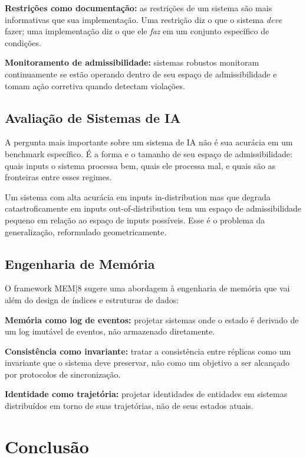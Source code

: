 \documentclass[11pt, a4paper]{article}
\theoremstyle{named}
\begin{document}
\textbf{Restrições como documentação:} as restrições de um sistema
são mais informativas que sua implementação. Uma restrição diz o que
o sistema \emph{deve} fazer; uma implementação diz o que ele \emph{faz}
em um conjunto específico de condições.

\textbf{Monitoramento de admissibilidade:} sistemas robustos monitoram
continuamente se estão operando dentro de seu espaço de admissibilidade
e tomam ação corretiva quando detectam violações.

\subsection{Avaliação de Sistemas de IA}

A pergunta mais importante sobre um sistema de IA não é sua acurácia
em um benchmark específico. É a forma e o tamanho de seu espaço de
admissibilidade: quais inputs o sistema processa bem, quais ele
processa mal, e quais são as fronteiras entre esses regimes.

Um sistema com alta acurácia em inputs in-distribution mas que degrada
catastroficamente em inputs out-of-distribution tem um espaço de
admissibilidade pequeno em relação ao espaço de inputs possíveis.
Esse é o problema da generalização, reformulado geometricamente.

\subsection{Engenharia de Memória}

O framework MEM|8 sugere uma abordagem à engenharia de memória
que vai além do design de índices e estruturas de dados:

\textbf{Memória como log de eventos:} projetar sistemas onde o estado
é derivado de um log imutável de eventos, não armazenado diretamente.

\textbf{Consistência como invariante:} tratar a consistência entre
réplicas como um invariante que o sistema deve preservar, não como
um objetivo a ser alcançado por protocolos de sincronização.

\textbf{Identidade como trajetória:} projetar identidades de entidades
em sistemas distribuídos em torno de suas trajetórias, não de seus
estados atuais.

\section*{Conclusão}
\end{document}
